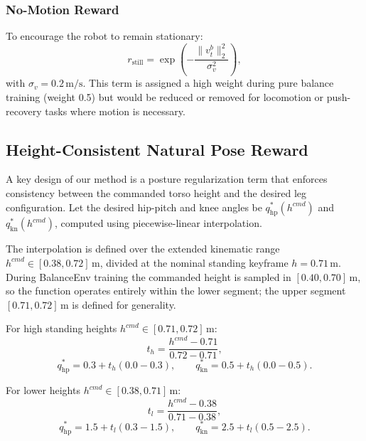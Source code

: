 \documentclass[conference]{IEEEtran}
\begin{document}
\subsubsection{No-Motion Reward}
To encourage the robot to remain stationary:
\begin{equation}
r_{\mathrm{still}} =
\exp\left(
-\frac{\|v_t^b\|_2^2}{\sigma_v^2}
\right),
\label{eq:no_motion}
\end{equation}
with $\sigma_v = 0.2\,\mathrm{m/s}$. This term is assigned a high weight during pure balance training (weight 0.5) but would be reduced or removed for locomotion or push-recovery tasks where motion is necessary.

\subsection{Height-Consistent Natural Pose Reward}
\label{sec:natural_pose}
A key design of our method is a posture regularization term that enforces consistency between the commanded torso height and the desired leg configuration. Let the desired hip-pitch and knee angles be $q_{\mathrm{hp}}^*(h^{cmd})$ and $q_{\mathrm{kn}}^*(h^{cmd})$, computed using piecewise-linear interpolation.

The interpolation is defined over the extended kinematic range $h^{cmd} \in [0.38, 0.72]\,\mathrm{m}$, divided at the nominal standing keyframe $h = 0.71\,\mathrm{m}$. During BalanceEnv training the commanded height is sampled in $[0.40, 0.70]\,\mathrm{m}$, so the function operates entirely within the lower segment; the upper segment $[0.71, 0.72]\,\mathrm{m}$ is defined for generality.

For high standing heights $h^{cmd}\in[0.71,0.72]\,\mathrm{m}$:
\begin{equation}
t_h = \frac{h^{cmd} - 0.71}{0.72 - 0.71},
\end{equation}
\begin{equation}
q_{\mathrm{hp}}^* = 0.3 + t_h(0.0 - 0.3),
\qquad
q_{\mathrm{kn}}^* = 0.5 + t_h(0.0 - 0.5).
\end{equation}

For lower heights $h^{cmd}\in[0.38,0.71]\,\mathrm{m}$:
\begin{equation}
t_l = \frac{h^{cmd} - 0.38}{0.71 - 0.38},
\end{equation}
\begin{equation}
q_{\mathrm{hp}}^* = 1.5 + t_l(0.3 - 1.5),
\qquad
q_{\mathrm{kn}}^* = 2.5 + t_l(0.5 - 2.5).
\end{equation}
\end{document}
